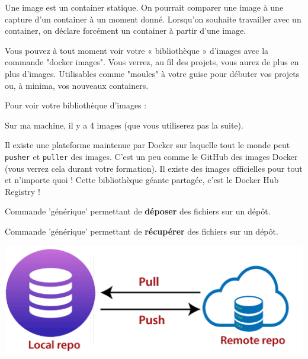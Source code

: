 \documentclass[french, 12pt]{article}%
\newcommand{\titreencadre}{Titre}
\newenvironment{encadre}[1]{\renewcommand{\titreencadre}{#1}
	\begin{mdframed}[style=encadrestyle]
	\vspace{0.5\baselineskip}
	}{%
	\end{mdframed}}
\begin{document}
\begin{encadre}{Image}
Une image est un container statique. On pourrait comparer une image à une capture d'un container à un moment donné. Lorsqu'on souhaite travailler avec un container, on déclare forcément un container à partir d'une image.
\end{encadre}

Vous pouvez à tout moment voir votre « bibliothèque » d'images avec la commande "docker images". Vous verrez, au fil des projets, vous aurez de plus en plus d'images. Utilisables comme "moules" à votre guise pour débuter vos projets ou, à minima, vos nouveaux containers.

Pour voir votre bibliothèque d'images :


Sur ma machine, il y a 4 images (que vous utiliserez pas la suite).

\vspace{0.5cm}


Il existe une plateforme maintenue par Docker sur laquelle tout le monde peut \verb?pusher? et \verb?puller? des images. C'est un peu comme le GitHub des images Docker (vous verrez cela durant votre formation). Il existe des images officielles pour tout et n'importe quoi ! Cette bibliothèque géante partagée, c'est le Docker Hub Registry !

\begin{encadre}{Push}
Commande 'générique' permettant de \textbf{déposer} des fichiers sur un dépôt. 
\end{encadre}
\begin{encadre}{Pull}
Commande 'générique' permettant de \textbf{récupérer} des fichiers sur un dépôt. 
\end{encadre}

\begin{center}
\includegraphics[scale=0.7]{./ressource/pull_push.png}
\end{center}
\end{document}
